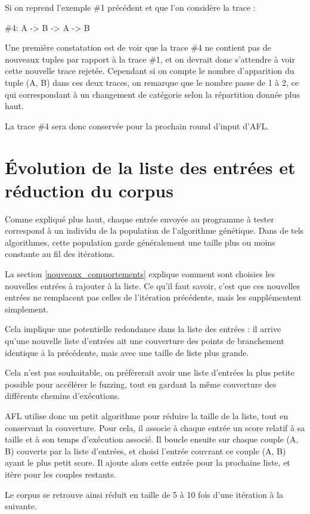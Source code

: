 Si on reprend l'exemple \#1 précédent et que l'on considère la trace :

\#4: A -> B -> A -> B

Une première constatation est de voir que la trace \#4 ne contient pas de
nouveaux tuples par rapport à la trace \#1, et on devrait donc s'attendre
à voir cette nouvelle trace rejetée. Cependant si on compte le nombre
d'apparition du tuple (A, B) dans ces deux traces, on remarque que le
nombre passe de 1 à 2, ce qui correspondant à un changement de catégorie
selon la répartition donnée plus haut.

La trace \#4 sera donc conservée pour la prochain round d'input d'AFL.

\section{Évolution de la liste des entrées et réduction du corpus}

Comme expliqué plus haut, chaque entrée envoyée au programme à tester
correspond à un individu de la population de l'algorithme génétique.
Dans de tels algorithmes, cette population garde généralement une taille
plus ou moins constante au fil des itérations.

La section \ref{nouveaux_comportements} explique comment sont choisies les
nouvelles entrées à rajouter à la liste. Ce qu'il faut savoir, c'est que
ces nouvelles entrées ne remplacent pas celles de l'itération précédente,
mais les supplémentent simplement.

Cela implique une potentielle redondance dans la liste des entrées :
il arrive qu'une nouvelle liste d'entrées ait une couverture des points
de branchement identique à la précédente, mais avec une taille de liste
plus grande.

Cela n'est pas souhaitable, on préférerait avoir une liste d'entrées la
plus petite possible pour accélérer le fuzzing, tout en gardant la même
couverture des différents chemins d'exécutions.

AFL utilise donc un petit algorithme pour réduire la taille de la liste,
tout en conservant la couverture. Pour cela, il associe à chaque entrée
un score relatif à sa taille et à son temps d'exécution associé. Il boucle
ensuite sur chaque couple (A, B) couverts par la liste d'entrées, et choisi
l'entrée couvrant ce couple (A, B) ayant le plus petit score. Il ajoute alors
cette entrée pour la prochaine liste, et itère pour les couples restants.

Le corpus se retrouve ainsi réduit en taille de 5 à 10 fois d'une itération
à la suivante.

